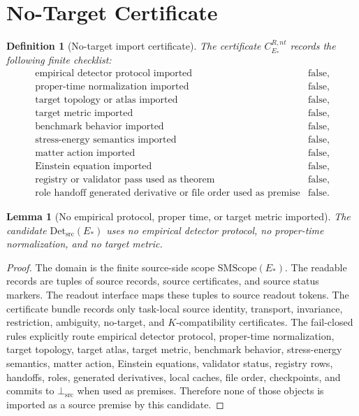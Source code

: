\documentclass[11pt]{article}
\newcommand{\EStar}{E_{\ast}}
\newcommand{\SMScope}{\mathrm{SMScope}}
\newcommand{\DetSrc}{\mathrm{Det}_{\mathrm{src}}}
\newcommand{\BottomSrc}{\bot_{\mathrm{src}}}
\newtheorem{definition}{Definition}
\newtheorem{lemma}{Lemma}
\begin{document}
\section{No-Target Certificate}

\begin{definition}[No-target import certificate]
The certificate \(C^{R,nt}_{\EStar}\) records the following finite checklist:
\[
\begin{array}{ll}
\text{empirical detector protocol imported} & \text{false},\\
\text{proper-time normalization imported} & \text{false},\\
\text{target topology or atlas imported} & \text{false},\\
\text{target metric imported} & \text{false},\\
\text{benchmark behavior imported} & \text{false},\\
\text{stress-energy semantics imported} & \text{false},\\
\text{matter action imported} & \text{false},\\
\text{Einstein equation imported} & \text{false},\\
\text{registry or validator pass used as theorem} & \text{false},\\
\text{role handoff generated derivative or file order used as premise} & \text{false}.
\end{array}
\]
\end{definition}

\begin{lemma}[No empirical protocol, proper time, or target metric imported]
The candidate \(\DetSrc(\EStar)\) uses no empirical detector protocol, no
proper-time normalization, and no target metric.
\end{lemma}

\begin{proof}
The domain is the finite source-side scope \(\SMScope(\EStar)\). The readable
records are tuples of source records, source certificates, and source status
markers. The readout interface maps these tuples to source readout tokens.
The certificate bundle records only task-local source identity, transport,
invariance, restriction, ambiguity, no-target, and \(K\)-compatibility
certificates. The fail-closed rules explicitly route empirical detector
protocol, proper-time normalization, target topology, target atlas, target
metric, benchmark behavior, stress-energy semantics, matter action, Einstein
equations, validator status, registry rows, handoffs, roles, generated
derivatives, local caches, file order, checkpoints, and commits to
\(\BottomSrc\) when used as premises. Therefore none of those objects is
imported as a source premise by this candidate.
\end{proof}
\end{document}
